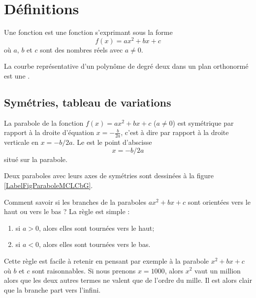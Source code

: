 
\section{Définitions}

\begin{definition}
    Une fonction  est une fonction s'exprimant sous la forme 
    \begin{equation}
    f(x)=ax^2+bx+c
    \end{equation}
    où \( a\), \( b\) et \( c\) sont des nombres réels avec \( a\neq 0\). 
    
    La courbe représentative d'un polynôme de degré deux dans un plan orthonormé est une .
\end{definition}

\subsection{Symétries, tableau de variations}

La parabole de la fonction \( f(x)=ax^2+bx+c\) (\( a\neq 0\)) est symétrique par rapport à la droite d'équation \( x=-\frac{ b }{ 2a }\), c'est à dire par rapport à la droite verticale en \( x=-b/2a\). Le  est le point d'abscisse 
\begin{equation}
x=-b/2a
\end{equation}
situé sur la parabole.

Deux paraboles avec leurs axes de symétries sont dessinées à la figure \ref{LabelFigParaboleMCLCbG}.
\newcommand{\CaptionFigParaboleMCLCbG}{Deux paraboles}


Comment savoir si les branches de la paraboles \( ax^2+bx+c\) sont orientées vers le haut ou vers le bas ? La règle est simple : 
\begin{enumerate}
    \item
        si \( a>0\), alors elles sont tournées vers le haut;
    \item
        si \( a<0\), alors elles sont tournées vers le bas.
\end{enumerate}
Cette règle est facile à retenir en pensant par exemple à la parabole \( x^2+bx+c\) où \( b\) et \( c\) sont raisonnables. Si nous prenons \( x=1000\), alors \( x^2\) vaut un million alors que les deux autres termes ne valent que de l'ordre du mille. Il est alors clair que la branche part vers l'infini.

